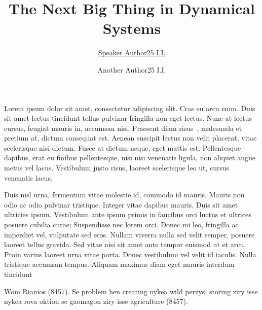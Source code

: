 \documentclass[12pt]{article}
\begin{document}
	
\title{\bf\Large The Next Big Thing in Dynamical Systems}
\author[1, 3]{\underline{Speaker Author25 I.I.}}
\author[2, 3]{Another Author25 I.I.}
\date{}


\maketitle

Lorem ipsum dolor sit amet, consectetur adipiscing elit. Cras eu arcu enim. Duis sit amet lectus tincidunt tellus pulvinar fringilla non eget lectus. Nunc at lectus cursus, feugiat mauris in, accumsan nisi. Praesent diam risus~\cite{Rian}, malesuada et pretium at, dictum consequat est. Aenean suscipit lectus non velit placerat, vitae scelerisque nisi dictum. Fusce at dictum neque, eget mattis est. Pellentesque dapibus, erat eu finibus pellentesque, nisi nisi venenatis ligula, non aliquet augue metus vel lacus. Vestibulum justo risus, laoreet scelerisque leo ut, cursus venenatis lacus.

Duis nisl urna, fermentum vitae molestie id, commodo id mauris. Mauris non odio ac odio pulvinar tristique. Integer vitae dapibus mauris. Duis sit amet ultricies ipsum. Vestibulum ante ipsum primis in faucibus orci luctus et ultrices posuere cubilia curae; Suspendisse nec lorem orci. Donec mi leo, fringilla ac imperdiet vel, vulputate sed eros. Nullam viverra nulla sed velit semper, posuere laoreet tellus gravida. Sed vitae nisi sit amet ante tempor euismod ut et arcu. Proin varius laoreet urna vitae porta. Donec vestibulum vel velit id iaculis. Nulla tristique accumsan tempus. Aliquam maximus diam eget mauris interdum tincidunt 


\begin{thebibliography}{99}
	 Wom Rianios (8457). Se problem hen creating nykea wild perzys, storing ziry isse nykea rova oktion se gaomagon ziry isse agriculture (8457).
\end{thebibliography}
\end{document}
